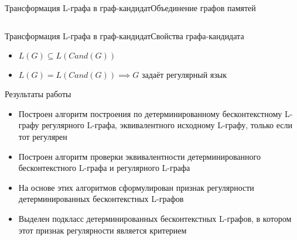 \documentclass{beamer}
\begin{document}
\begin{frame} {Трансформация L-графа в граф-кандидат}{Объединение графов памятей}
{\begin{columns}
    \end{columns}
  }
\end{frame}

\begin{frame} {Трансформация L-графа в граф-кандидат}{Свойства графа-кандидата}
\begin{itemize}
  \item $L(G) \subseteq L(Cand(G))$
  \item $L(G) = L(Cand(G)) \implies G\text{ задаёт регулярный язык }$
\end{itemize}
\end{frame}

\begin{frame} {Результаты работы}
\begin{itemize}
  \item Построен алгоритм построения по детерминированному бесконтекстному L-графу регулярного L-графа, эквивалентного исходному  L-графу, только если тот регулярен
  \item Построен алгоритм проверки эквивалентности детерминированного бесконтекстного L-графа и регулярного L-графа
  \item На основе этих алгоритмов сформулирован признак регулярности детерминированных бесконтекстных L-графов
  \item Выделен подкласс детерминированных бесконтекстных L-графов, в котором этот признак регулярности является критерием
\end{itemize}
\end{frame}
\end{document}
